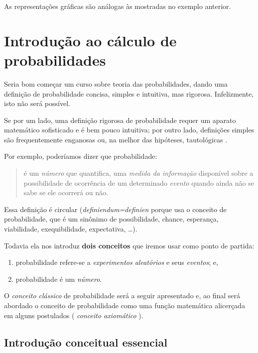 \documentclass[
]{book}
\providecommand{\tightlist}{%
  \setlength{\itemsep}{0pt}\setlength{\parskip}{0pt}}
\begin{document}
As representações gráficas são análogas às mostradas no exemplo anterior.

\hypertarget{introduuxe7uxe3o-ao-cuxe1lculo-de-probabilidades}{%
\chapter{Introdução ao cálculo de probabilidades}\label{introduuxe7uxe3o-ao-cuxe1lculo-de-probabilidades}}

Seria bom começar um curso sobre teoria das probabilidades, dando uma definição de probabilidade concisa, simples e intuitiva, mas rigorosa. Infelizmente, isto não será possível.

Se por um lado, uma definição rigorosa de probabilidade requer um aparato matemático sofisticado e é bem pouco intuitiva; por outro lado, definições simples são frequentemente enganosas ou, na melhor das hipóteses, tautológicas .

Por exemplo, poderíamos dizer que probabilidade:

\begin{quote}
é um \emph{número} que quantifica, uma \emph{medida da informação} disponível sobre a possibilidade de ocorrência de um determinado \emph{evento} quando ainda não se sabe se ele ocorrerá ou não.
\end{quote}

Essa definição é circular (\emph{definiendum=definien} porque usa o conceito de probabilidade, que é um sinônimo de possibilidade, chance, esperança, viabilidade, exequibilidade, expectativa, \dots).

Todavia ela nos introduz \textbf{dois conceitos} que iremos usar como ponto de partida:

\begin{enumerate}
\def\labelenumi{\arabic{enumi}.}
\tightlist
\item
  probabilidade refere-se a \emph{experimentos aleatórios} e seus \emph{eventos}; e,
\item
  probabilidade é um \emph{número}.
\end{enumerate}

O \emph{conceito clássico} de probabilidade será a seguir apresentado e, ao final será abordado o conceito de probabilidade como uma função matemática alicerçada em alguns postulados ( \emph{conceito axiomático} ).

\hypertarget{introduuxe7uxe3o-conceitual-essencial-1}{%
\section{Introdução conceitual essencial}\label{introduuxe7uxe3o-conceitual-essencial-1}}
\end{document}
